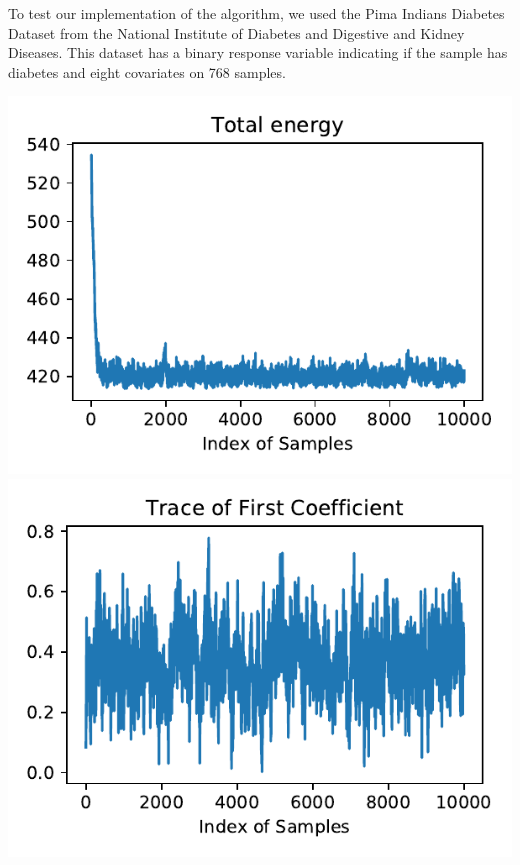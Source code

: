 To test our implementation of the algorithm, we used the Pima Indians Diabetes Dataset from the National Institute of Diabetes and Digestive and Kidney Diseases. This dataset has a binary response variable indicating if the sample has diabetes and eight covariates on 768 samples.

\includegraphics{hmc-energy-pima.pdf}
\includegraphics{sghmc-trace-pima.pdf}